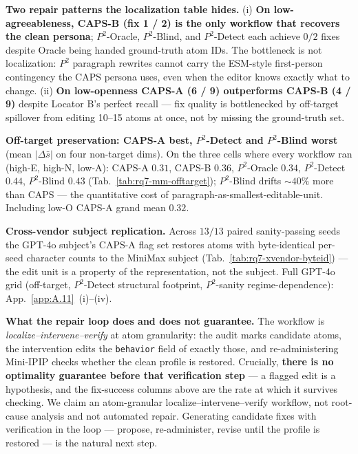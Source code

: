 \textbf{Two repair patterns the localization table hides.} (i) \textbf{On low-agreeableness, CAPS-B (fix 1 / 2) is the only workflow that recovers the clean persona}; $P^{\!2}$-Oracle, $P^{\!2}$-Blind, and $P^{\!2}$-Detect each achieve $0 / 2$ fixes despite Oracle being handed ground-truth atom IDs. The bottleneck is not localization: $P^{\!2}$ paragraph rewrites cannot carry the ESM-style first-person contingency the CAPS persona uses, even when the editor knows exactly what to change. (ii) \textbf{On low-openness CAPS-A (6 / 9) outperforms CAPS-B (4 / 9)} despite Locator B's perfect recall --- fix quality is bottlenecked by off-target spillover from editing 10--15 atoms at once, not by missing the ground-truth set.

\textbf{Off-target preservation: CAPS-A best, $P^{\!2}$-Detect and $P^{\!2}$-Blind worst} (mean $|\Delta\bar{s}|$ on four non-target dims). On the three cells where every workflow ran (high-E, high-N, low-A): CAPS-A $0.31$, CAPS-B $0.36$, $P^{\!2}$-Oracle $0.34$, $P^{\!2}$-Detect $0.44$, $P^{\!2}$-Blind $0.43$ (Tab.~\ref{tab:rq7-mm-offtarget}); $P^{\!2}$-Blind drifts $\sim 40\%$ more than CAPS --- the quantitative cost of paragraph-as-smallest-editable-unit. Including low-O CAPS-A grand mean $0.32$.

\textbf{Cross-vendor subject replication.} Across $13/13$ paired sanity-passing seeds the GPT-4o subject's CAPS-A flag set restores atoms with byte-identical per-seed character counts to the MiniMax subject (Tab.~\ref{tab:rq7-xvendor-byteid}) --- the edit unit is a property of the representation, not the subject. Full GPT-4o grid (off-target, $P^{\!2}$-Detect structural footprint, $P^{\!2}$-sanity regime-dependence): App.~\ref{app:A.11}~(i)--(iv).

\textbf{What the repair loop does and does not guarantee.} The workflow is \textit{localize--intervene--verify} at atom granularity: the audit marks candidate atoms, the intervention edits the \texttt{behavior} field of exactly those, and re-administering Mini-IPIP checks whether the clean profile is restored. Crucially, \textbf{there is no optimality guarantee before that verification step} --- a flagged edit is a hypothesis, and the fix-success columns above are the rate at which it survives checking. We claim an atom-granular localize--intervene--verify workflow, not root-cause analysis and not automated repair. Generating candidate fixes with verification in the loop --- propose, re-administer, revise until the profile is restored --- is the natural next step.

